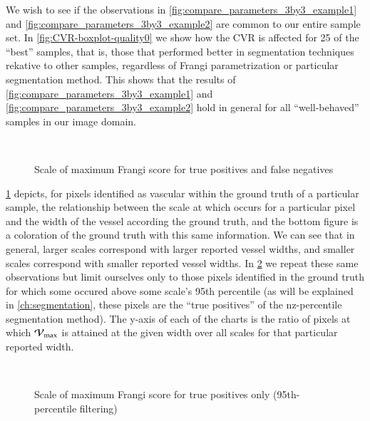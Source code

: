 We wish to see if the observations in \cref{fig:compare_parameters_3by3_example1} and \cref{fig:compare_parameters_3by3_example2} are common to our entire sample set. In \cref{fig:CVR-boxplot-quality0} we show how the CVR is affected for 25 of the ``best'' samples, that is, those that performed better in segmentation techniques rekative to other samples, regardless of Frangi parametrization or particular segmentation method. This shows that the  results of \cref{fig:compare_parameters_3by3_example1} and \cref{fig:compare_parameters_3by3_example2} hold in general for all ``well-behaved'' samples in our image domain. 
\begin{figure}[p]\centering
  \\[-0.5cm]
  \caption{Scale of maximum Frangi score for true positives and false negatives}
  \label{fig:scale_of_max_frangi_score}
\end{figure}

\cref{fig:scale_of_max_frangi_score} depicts, for pixels identified as vascular within the ground truth of a particular sample, the relationship between the scale at which \Vmax occurs for a particular pixel and the width of the vessel according the ground truth, and the bottom figure is a coloration of the ground truth with this same information. We can see that in general, larger scales correspond with larger reported vessel widths, and smaller scales correspond with smaller reported vessel widths.
In \cref{fig:scale_of_max_frangi_score_tp_only} we repeat these same observations but limit ourselves only to those pixels identified in the ground truth for which some \Vsigma  occured above some scale's 95th percentile (as will be explained in \cref{ch:segmentation}, these pixels are the ``true positives'' of the nz-percentile segmentation method). The y-axis of each of the charts is the ratio of pixels at which $\mathcal{V}_{\max}$ is attained at the given width over all scales for that particular reported width.

\begin{figure}[p]\centering
  \\[-0.5cm]
  \caption{Scale of maximum Frangi score for true positives only (95th-percentile filtering)}
  \label{fig:scale_of_max_frangi_score_tp_only}
\end{figure}



